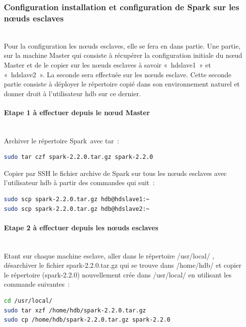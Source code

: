 \documentclass[12pt,french]{book}
\begin{document}
\subsubsection{Configuration installation et configuration de Spark sur les nœuds esclaves}\mbox{}\\

Pour la configuration les nœuds esclaves, elle se fera en dans partie.
Une partie, sur la machine Master qui consiste à récupérer la configuration initiale du nœud Master et de le copier sur les nœuds esclaves à savoir « hdslave1 » et « hdslave2 ».
La seconde sera effectuée sur les nœuds esclave. Cette seconde partie consiste à déployer le répertoire copié dans son environnement naturel et donner droit à l’utilisateur hdb sur ce dernier. 

\paragraph{Etape 1 à effectuer depuis le nœud Master}\mbox{}\\

Archiver le répertoire Spark avec tar :  

\begin{lstlisting}[language=bash, frame=single]
sudo tar czf spark-2.2.0.tar.gz spark-2.2.0
\end{lstlisting}

Copier par SSH le fichier archive de Spark sur tous les nœuds esclaves avec l’utilisateur hdb à partir des commandes qui suit :

\begin{lstlisting}[language=bash, frame=single]
sudo scp spark-2.2.0.tar.gz hdb@hdslave1:~
sudo scp spark-2.2.0.tar.gz hdb@hdslave2:~
\end{lstlisting}

\paragraph{Etape 2 à effectuer depuis les nœuds esclaves}\mbox{}\\

Etant sur chaque machine esclave, aller dans le répertoire /usr/local/ , désarchiver le fichier  spark-2.2.0.tar.gz qui se trouve dans /home/hdb/ et copier le répertoire (spark-2.2.0) nouvellement crée dans /usr/local/ en utilisant les commande suivantes :

\begin{lstlisting}[language=bash, frame=single]
cd /usr/local/
sudo tar xzf /home/hdb/spark-2.2.0.tar.gz 
sudo cp /home/hdb/spark-2.2.0.tar.gz spark-2.2.0
\end{lstlisting}
\end{document}
